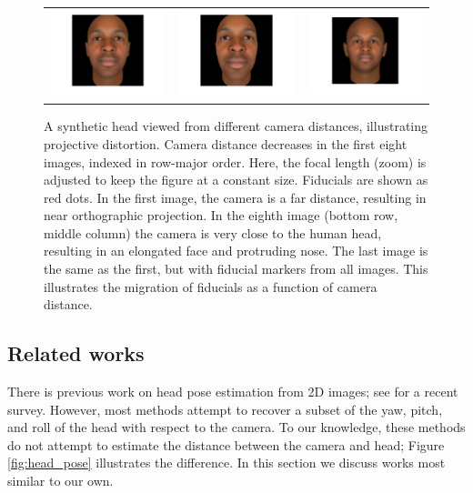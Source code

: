 \documentclass[runningheads]{llncs}
\begin{document}
\begin{figure}[ht!]
\begin{tabular}{ccc}
\includegraphics[width=.33\linewidth]{resources/figures/extracted_fiducial_0005.png} &
\includegraphics[width=.33\linewidth]{resources/figures/extracted_fiducial_0007.png} &
\includegraphics[width=.33\linewidth]{resources/figures/fiducial_migration.png}
\end{tabular}
\caption{
A synthetic head viewed from different camera distances, illustrating projective distortion.
Camera distance decreases in the first eight images, indexed in row-major order.
Here, the focal length (zoom) is adjusted to keep the figure at a constant size.
Fiducials are shown as red dots.
In the first image, the camera is a far distance, resulting in near orthographic projection.
In the eighth image (bottom row, middle column) the camera is very close to the human head, resulting in an elongated face and protruding nose.  
The last image is the same as the first, but with fiducial markers from all images.
This illustrates the migration of fiducials as a function of camera distance. 
} 
\label{fig:fiducial_migration}
\end{figure}

\subsection{Related works} \label{sec:related}
There is previous work on head pose estimation from 2D images; see \cite{murphy2009head} for a recent survey.
However, most methods attempt to recover a subset of the yaw, pitch, and roll of the head with respect to the camera.
To our knowledge, these methods do not attempt to estimate the distance between the camera and head; Figure \ref{fig:head_pose} illustrates the difference.
In this section we discuss works most similar to our own.
\end{document}

